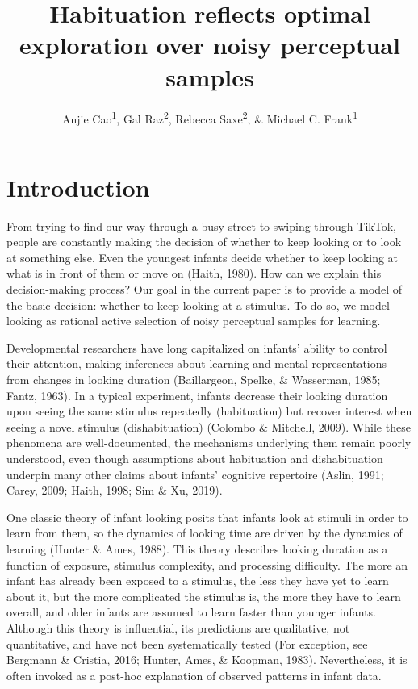 \documentclass[
  man,floatsintext]{apa6}
\title{Habituation reflects optimal exploration over noisy perceptual samples}
\author{Anjie Cao\textsuperscript{1}, Gal Raz\textsuperscript{2}, Rebecca Saxe\textsuperscript{2}, \& Michael C. Frank\textsuperscript{1}}
\date{}
\affiliation{\vspace{0.5cm}\textsuperscript{1} Department of Psychology, Stanford University\\\textsuperscript{2} Department of Brain and Cognitive Sciences, MIT}
\begin{document}
\maketitle

\hypertarget{introduction}{%
\section{Introduction}\label{introduction}}

From trying to find our way through a busy street to swiping through TikTok, people are constantly making the decision of whether to keep looking or to look at something else. Even the youngest infants decide whether to keep looking at what is in front of them or move on (Haith, 1980). How can we explain this decision-making process? Our goal in the current paper is to provide a model of the basic decision: whether to keep looking at a stimulus. To do so, we model looking as rational active selection of noisy perceptual samples for learning.

Developmental researchers have long capitalized on infants' ability to control their attention, making inferences about learning and mental representations from changes in looking duration (Baillargeon, Spelke, \& Wasserman, 1985; Fantz, 1963). In a typical experiment, infants decrease their looking duration upon seeing the same stimulus repeatedly (habituation) but recover interest when seeing a novel stimulus (dishabituation) (Colombo \& Mitchell, 2009). While these phenomena are well-documented, the mechanisms underlying them remain poorly understood, even though assumptions about habituation and dishabituation underpin many other claims about infants' cognitive repertoire (Aslin, 1991; Carey, 2009; Haith, 1998; Sim \& Xu, 2019).

One classic theory of infant looking posits that infants look at stimuli in order to learn from them, so the dynamics of looking time are driven by the dynamics of learning (Hunter \& Ames, 1988). This theory describes looking duration as a function of exposure, stimulus complexity, and processing difficulty. The more an infant has already been exposed to a stimulus, the less they have yet to learn about it, but the more complicated the stimulus is, the more they have to learn overall, and older infants are assumed to learn faster than younger infants. Although this theory is influential, its predictions are qualitative, not quantitative, and have not been systematically tested (For exception, see Bergmann \& Cristia, 2016; Hunter, Ames, \& Koopman, 1983). Nevertheless, it is often invoked as a post-hoc explanation of observed patterns in infant data.
\end{document}
